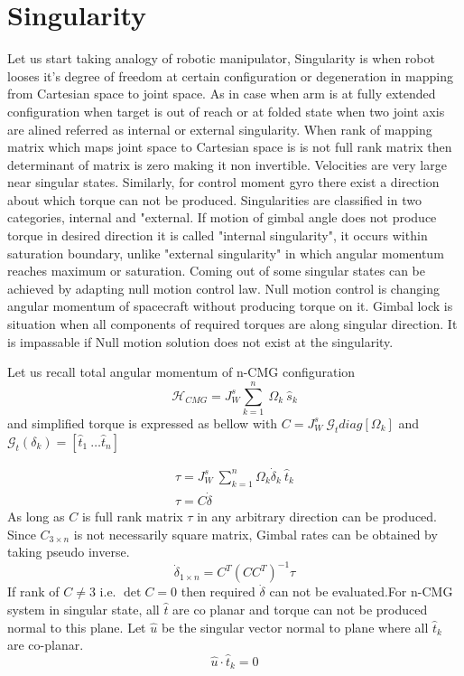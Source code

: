 \chapter{Singularity}
\label{chap:3}
Let us start taking analogy of robotic manipulator, Singularity is when robot looses it's degree of freedom at certain configuration or degeneration in mapping from Cartesian space to joint space. As in case when arm is at fully extended configuration when target is out of reach or at folded state when two joint axis are alined referred as internal or external singularity. When rank of mapping matrix which maps joint space to Cartesian space is is not full rank matrix then determinant of matrix is zero making it non invertible. Velocities are very large near singular states. Similarly, for control moment gyro there exist a direction about which torque can not be produced. Singularities are classified in two categories, internal and "external. If motion of gimbal angle does not produce torque in desired direction it is called "internal singularity", it occurs within saturation boundary, unlike "external singularity" in which angular momentum reaches maximum or saturation. Coming out of some singular states can be achieved by adapting null motion control law. Null motion control is changing angular momentum of spacecraft without producing torque on it. Gimbal lock is situation when all components of required torques are along singular direction. It is impassable if Null motion solution does not exist at the singularity.\cite{Leve2015}

Let us recall total angular momentum of n-CMG configuration
\begin{equation*}
\mathcal{H}_{CMG} =J^{s}_{W}\sum ^{n}_{k=1} \ \Omega _{k} \ \hat{s}_{k}
\end{equation*}
and simplified torque is expressed as bellow with $\displaystyle C=J^{s}_{W} \ \mathcal{G}_{t} diag[ \Omega _{k}]$ and $\displaystyle \mathcal{G}_{t}( \delta _{k}) =[\hat{t}_{1} \ \dotsc \hat{t}_{n}]$ 

\begin{gather*}
\tau =J^{s}_{W} \ \sum ^{n}_{k=1} \Omega _{k}\dot{\delta }_{k} \ \hat{t}_{k}\\
\tau =C\dot{\delta }
\end{gather*}As long as $\displaystyle C$ is full rank matrix $\displaystyle \tau $ in any arbitrary direction can be produced. Since $\displaystyle C_{3\times n}$ is not necessarily square matrix, Gimbal rates can be obtained by taking pseudo inverse.
\begin{equation*}
\dot{\delta }_{1\times n} =C^{T}\left( CC^{T}\right)^{-1} \tau 
\end{equation*}
If rank of $\displaystyle C\neq 3$ i.e. $\displaystyle \det C=0$ then required $\displaystyle \dot{\delta }$ can not be evaluated.For n-CMG system in singular state, all $\displaystyle \hat{t}$ are co planar and torque can not be produced normal to this plane. Let $\displaystyle \hat{u}$ be the singular vector normal to plane where all $\displaystyle \hat{t}_{k}$ are co-planar. 
\begin{equation*}
\hat{u} \cdotp \hat{t}_{k} =0
\end{equation*}


